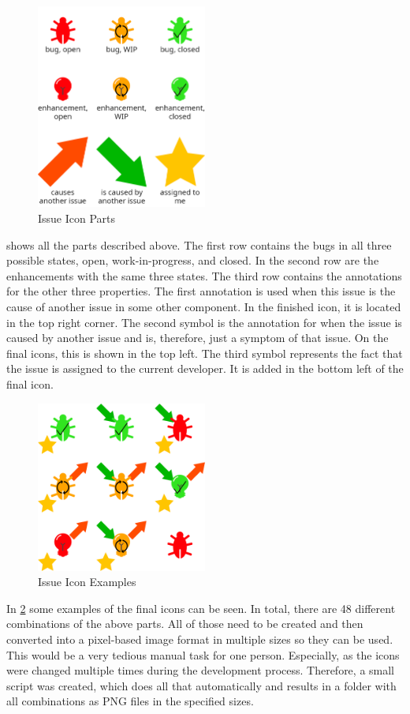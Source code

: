 \begin{figure}[!h]
	\centering
	\includegraphics[width=0.5\textwidth]{graphics/iconParts.png}
	\caption{Issue Icon Parts}
	\label{fig:c4:icon_parts}
\end{figure}
 shows all the parts described above.
The first row contains the bugs in all three possible states, open, work-in-progress, and closed.
In the second row are the enhancements with the same three states.
The third row contains the annotations for the other three properties.
The first annotation is used when this issue is the cause of another issue in some other component.
In the finished icon, it is located in the top right corner.
The second symbol is the annotation for when the issue is caused by another issue and is, therefore, just a symptom of that issue.
On the final icons, this is shown in the top left.
The third symbol represents the fact that the issue is assigned to the current developer.
It is added in the bottom left of the final icon.

\begin{figure}[!h]
	\centering
	\includegraphics[width=0.5\textwidth]{graphics/iconCombinations.png}
	\caption{Issue Icon Examples}
	\label{fig:c4:icon_combinations}
\end{figure}
In \cref{fig:c4:icon_combinations} some examples of the final icons can be seen.
In total, there are 48 different combinations of the above parts.
All of those need to be created and then converted into a pixel-based image format in multiple sizes so they can be used.
This would be a very tedious manual task for one person.
Especially, as the icons were changed multiple times during the development process.
Therefore, a small script was created, which does all that automatically and results in a folder with all combinations as \gls{PNG} files in the specified sizes.

